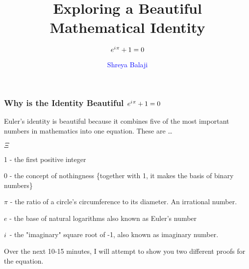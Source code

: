 \documentclass[10pt]{beamer}
\newcommand{\iu}{{i\mkern1mu}}
\begin{document}
\author{\textcolor{blue}{Shreya Balaji}}
\title{Exploring a Beautiful Mathematical Identity}
\subtitle{\huge\(e^{\iu \pi} +1 = 0\)}
\date{}


\begin{frame}[plain]
	\maketitle
\end{frame}

\begin{frame}
	\frametitle{Why is the Identity Beautiful \hspace{25pt} \textcolor{pink}{\Huge\(e^{\iu \pi} + 1 =0\)}}
	
	Euler's identity is beautiful because it combines five of the most important numbers in mathematics into one equation. These are \dots
	\begin{list}{$\Xi$}{}
	\item 1 - the first positive integer
	\item 0 - the concept of nothingness \{together with 1, it makes the basis of binary numbers\}
	\item {\bf${\pi}$} - the ratio of a circle's circumference to its diameter. An irrational number.
	\item $e$ - the base of natural logarithms also known as Euler's number
	\item $\iu$ - the "imaginary" square root of -1, also known as imaginary number.
	\end{list}
\vspace{20pt}
Over the next 10-15 minutes, I will attempt to show you two different proofs for the equation.
	
\end{frame}
\end{document}
